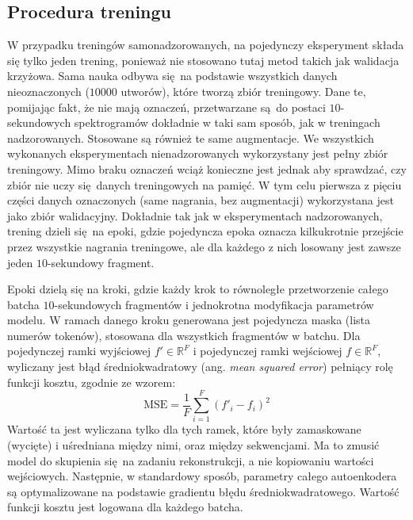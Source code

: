 \subsection{Procedura treningu}

W przypadku treningów samonadzorowanych, na pojedynczy eksperyment składa się tylko jeden trening, ponieważ nie stosowano tutaj metod takich jak walidacja krzyżowa. Sama nauka odbywa się na podstawie wszystkich danych nieoznaczonych ($10000$ utworów), które tworzą zbiór treningowy. Dane te, pomijając fakt, że nie mają oznaczeń, przetwarzane są do postaci $10$-sekundowych spektrogramów dokładnie w taki sam sposób, jak w treningach nadzorowanych. Stosowane są również te same augmentacje. We wszystkich wykonanych eksperymentach nienadzorowanych wykorzystany jest pełny zbiór treningowy. Mimo braku oznaczeń wciąż konieczne jest jednak aby sprawdzać, czy zbiór nie uczy się danych treningowych na pamięć. W tym celu pierwsza z pięciu części danych oznaczonych (same nagrania, bez augmentacji) wykorzystana jest jako zbiór walidacyjny. Dokładnie tak jak w eksperymentach nadzorowanych, trening dzieli się na epoki, gdzie pojedyncza epoka oznacza kilkukrotnie przejście przez wszystkie nagrania treningowe, ale dla każdego z nich losowany jest zawsze jeden $10$-sekundowy fragment.

Epoki dzielą się na kroki, gdzie każdy krok to równoległe przetworzenie całego batcha $10$-sekundowych fragmentów i jednokrotna modyfikacja parametrów modelu. W ramach danego kroku generowana jest pojedyncza maska (lista numerów tokenów), stosowana dla wszystkich fragmentów w batchu. Dla pojedynczej ramki wyjściowej $f' \in \mathbb{R}^F$ i pojedynczej ramki wejściowej $f \in \mathbb{R}^F$, wyliczany jest błąd średniokwadratowy (ang. \emph{mean squared error}) pełniący rolę funkcji kosztu, zgodnie ze wzorem:
\begin{equation}
    \textrm{MSE} = \frac{1}{F} \sum_{i=1}^{F} (f'_{i} - f_{i})^2
\end{equation}
Wartość ta jest wyliczana tylko dla tych ramek, które były zamaskowane (wycięte) i uśredniana między nimi, oraz między sekwencjami. Ma to zmusić model do skupienia się na zadaniu rekonstrukcji, a nie kopiowaniu wartości wejściowych.  Następnie, w standardowy sposób, parametry całego autoenkodera są optymalizowane na podstawie gradientu błędu średniokwadratowego.  Wartość funkcji kosztu jest logowana dla każdego batcha.

